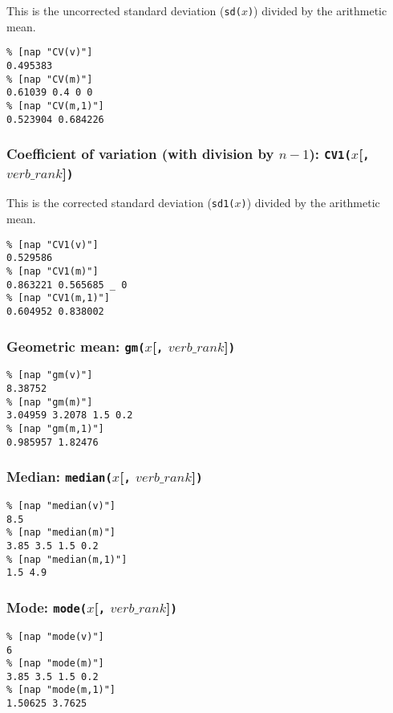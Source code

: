 This is the uncorrected standard deviation (\texttt{sd($x$)}) divided by the arithmetic mean.
\begin{verbatim}
% [nap "CV(v)"]
0.495383
% [nap "CV(m)"]
0.61039 0.4 0 0
% [nap "CV(m,1)"]
0.523904 0.684226
\end{verbatim}

\subsubsection{Coefficient of variation (with division by $n-1$):
\texttt{CV1(}$x$[\texttt{,} $\mathit{verb\_rank}$]\texttt{)}}
    \label{stat-CV1}

This is the corrected standard deviation (\texttt{sd1($x$)}) divided by the arithmetic mean.
\begin{verbatim}
% [nap "CV1(v)"]
0.529586
% [nap "CV1(m)"]
0.863221 0.565685 _ 0
% [nap "CV1(m,1)"]
0.604952 0.838002
\end{verbatim}

\subsubsection{Geometric mean: \texttt{gm(}$x$[\texttt{,} $\mathit{verb\_rank}$]\texttt{)}}
    \label{stat-gm}

  \begin{verbatim}
% [nap "gm(v)"]
8.38752
% [nap "gm(m)"]
3.04959 3.2078 1.5 0.2
% [nap "gm(m,1)"]
0.985957 1.82476
\end{verbatim}

\subsubsection{Median: \texttt{median(}$x$[\texttt{,} $\mathit{verb\_rank}$]\texttt{)}}
    \label{stat-median}

  \begin{verbatim}
% [nap "median(v)"]
8.5
% [nap "median(m)"]
3.85 3.5 1.5 0.2
% [nap "median(m,1)"]
1.5 4.9
\end{verbatim}

\subsubsection{Mode: \texttt{mode(}$x$[\texttt{,} $\mathit{verb\_rank}$]\texttt{)}}
    \label{stat-mode}

  \begin{verbatim}
% [nap "mode(v)"]
6
% [nap "mode(m)"]
3.85 3.5 1.5 0.2
% [nap "mode(m,1)"]
1.50625 3.7625
\end{verbatim}


